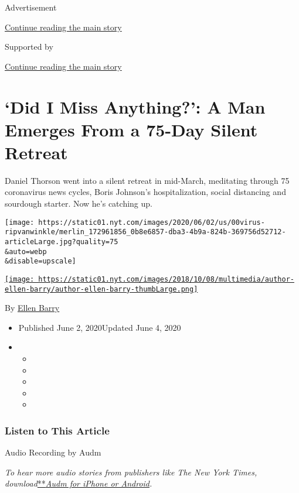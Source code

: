 Advertisement

\protect\hyperlink{after-top}{Continue reading the main story}

Supported by

\protect\hyperlink{after-sponsor}{Continue reading the main story}

\hypertarget{did-i-miss-anything-a-man-emerges-from-a-75-day-silent-retreat}{%
\section{`Did I Miss Anything?': A Man Emerges From a 75-Day Silent
Retreat}\label{did-i-miss-anything-a-man-emerges-from-a-75-day-silent-retreat}}

Daniel Thorson went into a silent retreat in mid-March, meditating
through 75 coronavirus news cycles, Boris Johnson's hospitalization,
social distancing and sourdough starter. Now he's catching up.

\texttt{[image: https://static01.nyt.com/images/2020/06/02/us/00virus-ripvanwinkle/merlin\_172961856\_0b8e6857-dba3-4b9a-824b-369756d52712-articleLarge.jpg?quality=75\\\&auto=webp\\\&disable=upscale]}

\href{https://www.nytimes.com/by/ellen-barry}{\texttt{[image: https://static01.nyt.com/images/2018/10/08/multimedia/author-ellen-barry/author-ellen-barry-thumbLarge.png]}}

By \href{https://www.nytimes.com/by/ellen-barry}{Ellen Barry}

\begin{itemize}
\item
  Published June 2, 2020Updated June 4, 2020
\item
  \begin{itemize}
  \item
  \item
  \item
  \item
  \item
  \end{itemize}
\end{itemize}

\hypertarget{listen-to-this-article}{%
\subsubsection{Listen to This Article}\label{listen-to-this-article}}

Audio Recording by Audm

\emph{To hear more audio stories from publishers like The New York
Times,
download}\href{https://www.audm.com/?utm_source=nytmag\&utm_medium=embed\&utm_campaign=left_behind_draper}{**}\href{https://www.audm.com/?utm_source=nyt\&utm_medium=embed\&utm_campaign=rip_van_winkle}{\emph{Audm
for iPhone or Android}}\emph{.}

